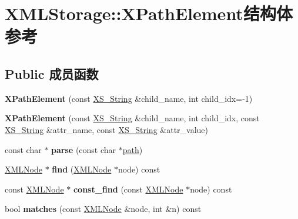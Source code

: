 \hypertarget{struct_x_m_l_storage_1_1_x_path_element}{}\section{X\+M\+L\+Storage\+:\+:X\+Path\+Element结构体 参考}
\label{struct_x_m_l_storage_1_1_x_path_element}
\subsection*{Public 成员函数}
\begin{DoxyCompactItemize}
\item 
\mbox{\label{struct_x_m_l_storage_1_1_x_path_element_a70327996dd31bc67fdd622b0580c87e2}} 
{\bfseries X\+Path\+Element} (const \hyperlink{struct_x_m_l_storage_1_1_x_s___string}{X\+S\+\_\+\+String} \&child\+\_\+name, int child\+\_\+idx=-\/1)
\item 
\mbox{\label{struct_x_m_l_storage_1_1_x_path_element_ad491f4706c809c9e57d79bdc41e00561}} 
{\bfseries X\+Path\+Element} (const \hyperlink{struct_x_m_l_storage_1_1_x_s___string}{X\+S\+\_\+\+String} \&child\+\_\+name, int child\+\_\+idx, const \hyperlink{struct_x_m_l_storage_1_1_x_s___string}{X\+S\+\_\+\+String} \&attr\+\_\+name, const \hyperlink{struct_x_m_l_storage_1_1_x_s___string}{X\+S\+\_\+\+String} \&attr\+\_\+value)
\item 
\mbox{\label{struct_x_m_l_storage_1_1_x_path_element_a1f948594ac93ceb5bf7bcce358b1d440}} 
const char $\ast$ {\bfseries parse} (const char $\ast$\hyperlink{structpath}{path})
\item 
\mbox{\label{struct_x_m_l_storage_1_1_x_path_element_a542da669de56132aa0f6dbb542e357c0}} 
\hyperlink{struct_x_m_l_storage_1_1_x_m_l_node}{X\+M\+L\+Node} $\ast$ {\bfseries find} (\hyperlink{struct_x_m_l_storage_1_1_x_m_l_node}{X\+M\+L\+Node} $\ast$node) const
\item 
\mbox{\label{struct_x_m_l_storage_1_1_x_path_element_a5603d3007a3e28878802937dc90a82d8}} 
const \hyperlink{struct_x_m_l_storage_1_1_x_m_l_node}{X\+M\+L\+Node} $\ast$ {\bfseries const\+\_\+find} (const \hyperlink{struct_x_m_l_storage_1_1_x_m_l_node}{X\+M\+L\+Node} $\ast$node) const
\item 
\mbox{\label{struct_x_m_l_storage_1_1_x_path_element_a58d7e8bdac608fb9338e3c59f0f67a50}} 
bool {\bfseries matches} (const \hyperlink{struct_x_m_l_storage_1_1_x_m_l_node}{X\+M\+L\+Node} \&node, int \&n) const
\end{DoxyCompactItemize}
